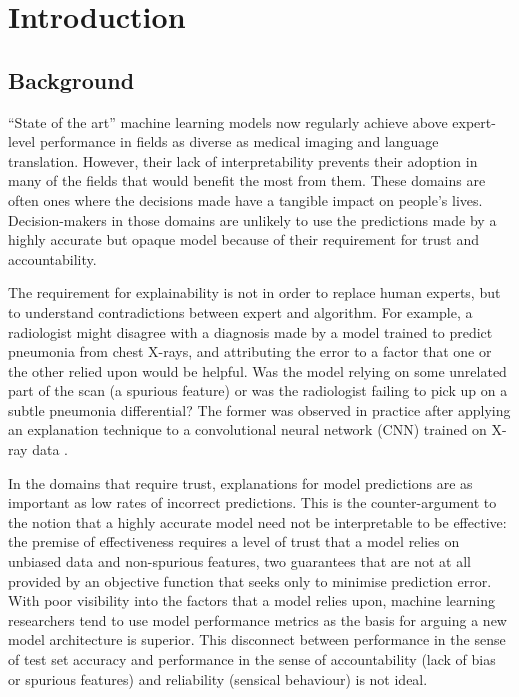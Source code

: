 \documentclass[main]{subfiles}
\begin{document}
\chapter{Introduction}

\section{Background} \label{sec:background}

``State of the art'' machine learning models now regularly achieve above expert-level performance in fields as diverse as medical imaging and language translation. However, their lack of interpretability prevents their adoption in many of the fields that would benefit the most from them. These domains are often ones where the decisions made have a tangible impact on people's lives. Decision-makers in those domains are unlikely to use the predictions made by a highly accurate but opaque model because of their requirement for trust and accountability.

The requirement for explainability is not in order to replace human experts, but to understand contradictions between expert and algorithm. For example, a radiologist might disagree with a diagnosis made by a model trained to predict pneumonia from chest X-rays, and attributing the error to a factor that one or the other relied upon would be helpful. Was the model relying on some unrelated part of the scan (a spurious feature) or was the radiologist failing to pick up on a subtle pneumonia differential? The former was observed in practice after applying an explanation technique to a convolutional neural network (CNN) trained on X-ray data \cite{xray}. 

In the domains that require trust, explanations for model predictions are as important as low rates of incorrect predictions. This is the counter-argument to the notion that a highly accurate model need not be interpretable to be effective: the premise of effectiveness requires a level of trust that a model relies on unbiased data and non-spurious features, two guarantees that are not at all provided by an objective function that seeks only to minimise prediction error. With poor visibility into the factors that a model relies upon, machine learning researchers tend to use model performance metrics as the basis for arguing a new model architecture is superior. This disconnect between performance in the sense of test set accuracy and performance in the sense of accountability (lack of bias or spurious features) and reliability (sensical behaviour) is not ideal.
\end{document}
